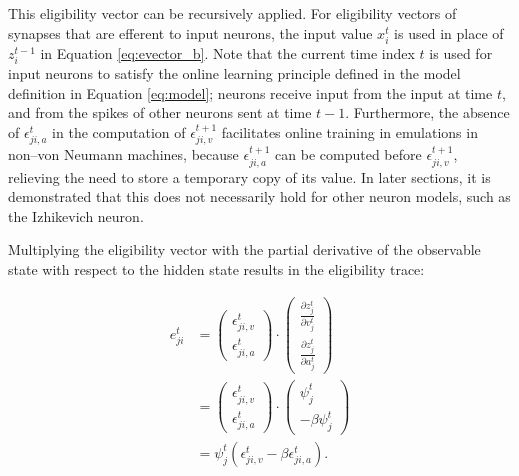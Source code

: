             This eligibility vector can be recursively applied.
            For eligibility vectors of synapses that are efferent to input neurons, the input value $x^t_i$ is used in place of $z_i^{t-1}$ in Equation \ref{eq:evector_b}.
            Note that the current time index $t$ is used for input neurons to satisfy the online learning principle defined in the model definition in Equation \ref{eq:model}; neurons receive input from the input at time $t$, and from the spikes of other neurons sent at time $t-1$.
            Furthermore, the absence of $\epsilon_{ji, a}^t$ in the computation of $\epsilon_{ji, v}^{t+1}$ facilitates online training in emulations in non--von Neumann machines, because $\epsilon_{ji, a}^{t+1}$ can be computed before $\epsilon_{ji, v}^{t+1}$, relieving the need to store a temporary copy of its value.
            In later sections, it is demonstrated that this does not necessarily hold for other neuron models, such as the Izhikevich neuron.

            Multiplying the eligibility vector with the partial derivative of the observable state with respect to the hidden state results in the eligibility trace:

            \begin{align}
            e^t_{ji} &= \begin{pmatrix}
            \epsilon_{ji, v}^t\\
            \epsilon_{ji, a}^t
            \end{pmatrix}
            \cdot
            \begin{pmatrix}
            \frac{\partial z^t_j}{\partial v^t_j}\\
            \frac{\partial z^t_j}{\partial a^t_j}
            \end{pmatrix}\\
            &= \begin{pmatrix}
            \epsilon_{ji, v}^t\\
            \epsilon_{ji, a}^t
            \end{pmatrix}
            \cdot
            \begin{pmatrix}
            \psi^t_j\\
            -\beta\psi^t_j
            \end{pmatrix}\\
            &= \psi^t_j\left(\epsilon_{ji, v}^t - \beta\epsilon_{ji, a}^t\right).
            \end{align}

